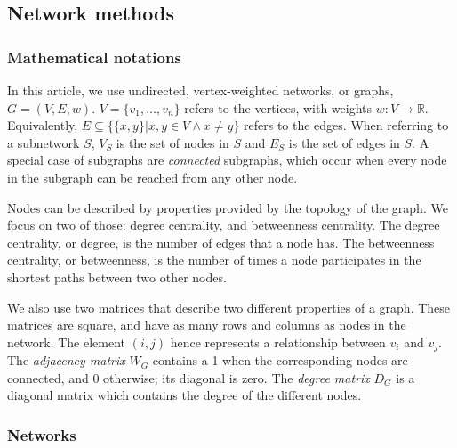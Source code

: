 \documentclass[10pt,letterpaper]{article}
\begin{document}
\subsection{Network methods}

\subsubsection{Mathematical notations}
\label{methods:notation}
In this article, we use undirected, vertex-weighted networks, or graphs, $G = (V,E,w)$. $V = \{v_{1}, \dots{}, v_{n}\}$ refers to the vertices, with weights $w: V \rightarrow \mathbb{R}$. Equivalently, $E \subseteq \{\{x,y\} | x,y \in V \wedge x \neq y\}$ refers to the edges. When referring to a subnetwork $S$, $V_{S}$ is the set of nodes in $S$ and $E_{S}$ is the set of edges in $S$. A special case of subgraphs are \emph{connected} subgraphs, which occur when every node in the subgraph can be reached from any other node.

Nodes can be described by properties provided by the topology of the graph. We focus on two of those: degree centrality, and betweenness centrality. The degree centrality, or degree, is the number of edges that a node has. The betweenness centrality, or betweenness, is the number of times a node participates in the shortest paths between two other nodes.

We also use two matrices that describe two different properties of a graph. These matrices are square, and have as many rows and columns as nodes in the network. The element $(i,j)$ hence represents a relationship between $v_i$ and $v_j$. The \emph{adjacency matrix} $W_G$ contains a 1 when the corresponding nodes are connected, and 0 otherwise; its diagonal is zero. The \emph{degree matrix} $D_G$ is a diagonal matrix which contains the degree of the different nodes.

\subsubsection{Networks}
\label{methods:networks}
\end{document}
